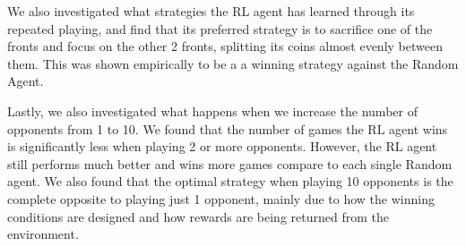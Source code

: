 \documentclass[11pt, oneside]{article}   	%
\begin{document}
\hfill

We also investigated what strategies the RL agent has learned through its repeated playing, and find that its preferred strategy is to sacrifice one of the fronts and focus on the other 2 fronts, splitting its coins almost evenly between them. This was shown empirically to be a a winning strategy against the Random Agent.

\hfill

Lastly, we also investigated what happens when we increase the number of opponents from 1 to 10. We found that the number of games the RL agent wins is significantly less when playing 2 or more opponents. However, the RL agent still performs much better and wins more games compare to each single Random agent. We also found that the optimal strategy when playing 10 opponents is the complete opposite to playing just 1 opponent, mainly due to how the winning conditions are designed and how rewards are being returned from the environment.

\nocite{*}


\end{document}
